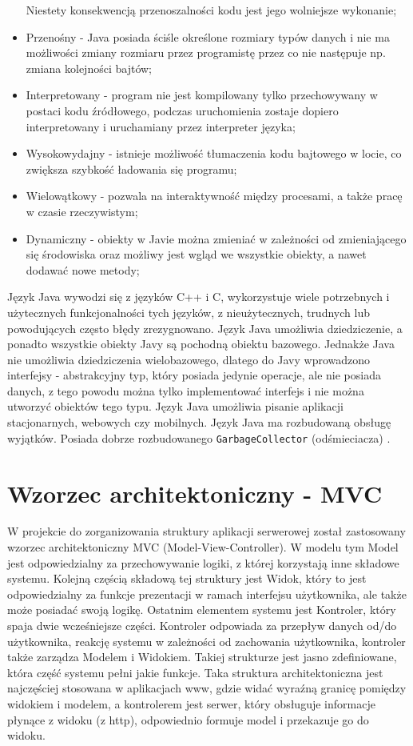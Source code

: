 \documentclass[eng,printmode,oneside]{mgr}
\begin{document}
\begin{itemize}
  Niestety konsekwencją przenoszalności kodu jest jego wolniejsze wykonanie;
  \item Przenośny - Java posiada ściśle określone rozmiary typów danych i nie ma
  możliwości zmiany rozmiaru przez programistę przez co nie następuje np. zmiana
  kolejności bajtów;
  \item Interpretowany - program nie jest kompilowany tylko przechowywany w
  postaci kodu źródłowego, podczas uruchomienia zostaje dopiero interpretowany i
  uruchamiany przez interpreter języka;
  \item Wysokowydajny - istnieje możliwość tłumaczenia kodu bajtowego w locie,
  co zwiększa szybkość ładowania się programu;
  \item Wielowątkowy - pozwala na interaktywność między procesami, a także pracę
  w czasie rzeczywistym;
  \item Dynamiczny - obiekty w Javie można zmieniać w zależności od
  zmieniającego się środowiska oraz możliwy jest wgląd we wszystkie obiekty, a
  nawet dodawać nowe metody;
\end{itemize}

Język Java wywodzi się z języków C++ i C, wykorzystuje wiele potrzebnych i
użytecznych funkcjonalności tych języków, z nieużytecznych, trudnych lub
powodujących często błędy zrezygnowano. Język Java umożliwia dziedziczenie, a
ponadto wszystkie obiekty Javy są pochodną obiektu bazowego. Jednakże Java nie
umożliwia dziedziczenia wielobazowego, dlatego do Javy wprowadzono interfejsy -
abstrakcyjny typ, który posiada jedynie operacje, ale nie posiada danych, z tego
powodu można tylko implementować interfejs i nie można utworzyć obiektów tego
typu. Język Java umożliwia pisanie aplikacji stacjonarnych, webowych czy
mobilnych. Język Java ma rozbudowaną obsługę wyjątków. Posiada dobrze
rozbudowanego \texttt{GarbageCollector} (odśmieciacza) \cite{java.doc}.

\section{Wzorzec architektoniczny - MVC}

W projekcie do zorganizowania struktury aplikacji serwerowej został zastosowany
wzorzec architektoniczny MVC (Model-View-Controller). W modelu tym Model jest
odpowiedzialny za przechowywanie logiki, z której korzystają inne składowe
systemu. Kolejną częścią składową tej struktury jest Widok, który to jest
odpowiedzialny za funkcje prezentacji w ramach interfejsu użytkownika, ale
także może posiadać swoją logikę. Ostatnim elementem systemu jest Kontroler,
który spaja dwie wcześniejsze części. Kontroler odpowiada za przepływ danych
od/do użytkownika, reakcję systemu w zależności od zachowania użytkownika,
kontroler także zarządza Modelem i Widokiem. Takiej strukturze jest jasno
zdefiniowane, która część systemu pełni jakie funkcje. Taka struktura
architektoniczna jest najczęściej stosowana w aplikacjach www, gdzie widać
wyraźną granicę pomiędzy widokiem i modelem, a kontrolerem jest serwer, który
obsługuje informacje płynące z widoku (z http), odpowiednio formuje model i
przekazuje go do widoku. \cite{java.mvc}
\end{document}
